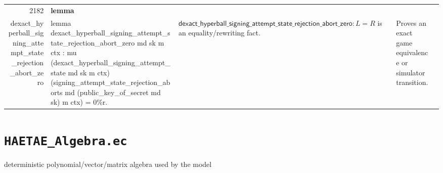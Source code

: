 \documentclass[10pt]{article}
\newcommand{\ec}[1]{\begingroup\ttfamily\scriptsize #1\endgroup}
\begin{document}
\begin{longtable}{r L{0.17\textwidth} L{0.26\textwidth} L{0.27\textwidth} L{0.20\textwidth}}
2182 & \textbf{lemma}\\\ec{dexact\_hyperball\_signing\_attempt\_state\_rejection\_abort\_zero} & \ec{lemma dexact\_hyperball\_signing\_attempt\_state\_rejection\_abort\_zero md sk m ctx : mu (dexact\_hyperball\_signing\_attempt\_state md sk m ctx) (signing\_attempt\_state\_rejection\_aborts md (public\_key\_of\_secret md sk) m ctx) = 0\%r.} & \(\mathsf{dexact\_hyperball\_signing\_attempt\_state\_rejection\_abort\_zero} : L = R\) is an equality/rewriting fact. & Proves an exact game equivalence or simulator transition. \\
\bottomrule
\end{longtable}

\clearpage
\section{\texorpdfstring{\texttt{HAETAE\_Algebra.ec}}{HAETAE Algebra.ec}}
deterministic polynomial/vector/matrix algebra used by the model
\end{document}
